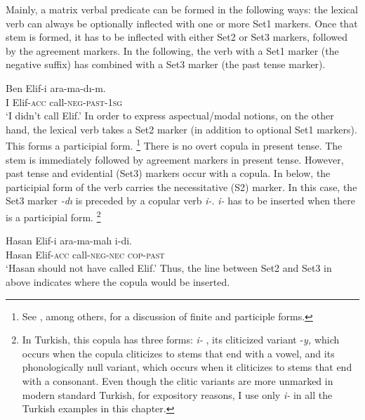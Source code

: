 \documentclass[output=paper]{langsci/langscibook}
\begin{document}
Mainly, a matrix verbal predicate can be formed in the following ways: 
the lexical verb can always be optionally inflected with one or more Set1 markers. 
Once that stem is formed, it has to be inflected with either Set2 or Set3 markers, followed by the agreement markers. 
In the following, the verb with a Set1 marker (the negative suffix) has combined with a Set3 marker (the past tense marker).

\ea%
    \label{kelepirex:key:4}
    \gll Ben Elif-i ara-ma-dı-m.\\
    I Elif-\textsc{acc} call-\textsc{neg}-\textsc{past}-\textsc{1sg} \\
    \glt `I didn't call Elif.'
\z 
In order to express aspectual/modal notions, on the other hand, the lexical verb takes a Set2 marker (in addition to optional Set1 markers). 
This forms a participial form.%
\footnote{
    See \citealt{Lees1962,Kornfilt1996,Goksel1997,Kelepir2001,Sezer2001}, among others, 
    for a discussion of finite and participle forms.
} 
There is no overt copula in present tense. 
The stem is immediately followed by agreement markers in present tense. 
However, past tense and evidential (Set3) markers  occur with a copula. 
In  below, the participial form of the verb carries the necessitative (S2) marker. 
In this case, the Set3 marker \textit{-dı} is preceded by a copular verb \textit{i-}. 
\textit{i-} has to be inserted when there is a participial form.%
\footnote{
    \label{kelepirftn:key:7}
    In Turkish, this copula has three forms: 
    \textit{i-} , 
    its cliticized variant -\textit{y,} which occurs when the copula cliticizes to stems that end with a vowel, 
    and its phonologically null variant, which occurs when it cliticizes to stems that end with a consonant. 
    Even though the clitic variants are more unmarked in modern standard Turkish, for expository reasons, 
    I use only \textit{i-} in all the Turkish examples in this chapter.
}

\ea%
    \label{kelepirex:key:5}
    \gll Hasan Elif-i ara-ma-malı i-di.\\
    Hasan Elif-\textsc{acc} call-\textsc{neg}{}-\textsc{nec} \textsc{cop}{}-\textsc{past} \\
    \glt `Hasan should not have called Elif.'
    \z
Thus, the line between Set2 and Set3 in  above indicates where the copula would be inserted. 
\end{document}
